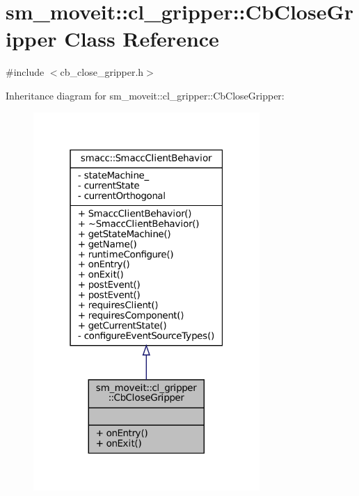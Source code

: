 \hypertarget{classsm__moveit_1_1cl__gripper_1_1CbCloseGripper}{}\section{sm\+\_\+moveit\+:\+:cl\+\_\+gripper\+:\+:Cb\+Close\+Gripper Class Reference}
\label{classsm__moveit_1_1cl__gripper_1_1CbCloseGripper}


{\ttfamily \#include $<$cb\+\_\+close\+\_\+gripper.\+h$>$}



Inheritance diagram for sm\+\_\+moveit\+:\+:cl\+\_\+gripper\+:\+:Cb\+Close\+Gripper\+:
\nopagebreak
\begin{figure}[H]
\begin{center}
\leavevmode
\includegraphics[width=244pt]{classsm__moveit_1_1cl__gripper_1_1CbCloseGripper__inherit__graph}
\end{center}
\end{figure}


